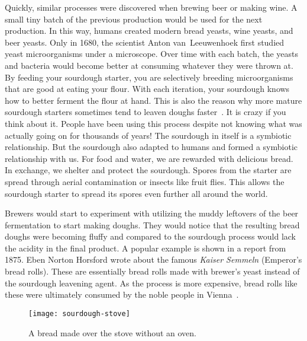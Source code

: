 Quickly, similar processes were discovered when brewing beer
or making wine. A small tiny batch of the previous production
would be used for the next production. In this way, humans created
modern bread yeasts, wine yeasts, and beer yeasts. Only in 1680,
the scientist Anton van~Leeuwenhoek first studied yeast microorganisms
under a microscope. Over time with each batch, the yeasts and bacteria
would become better at consuming whatever they were thrown at.
By feeding your sourdough starter, you are selectively breeding
microorganisms that are good at eating your flour. With
each iteration, your sourdough knows how to better ferment the flour
at hand. This is also the reason why more mature sourdough starters sometimes
tend to leaven doughs faster~\cite{review+of+sourdough+starters}. It is crazy if you
think about it. People have been using this process despite not
knowing what was actually going on for thousands of years! The
sourdough in itself is a symbiotic relationship. But the sourdough
also adapted to humans and formed a symbiotic relationship with us.
For food and water, we are rewarded with delicious bread. In exchange,
we shelter and protect the sourdough. Spores from the starter
are spread through aerial contamination or insects like fruit flies.
This allows the sourdough starter to spread its spores even
further all around the world.

Brewers would start to experiment with utilizing the muddy leftovers
of the beer fermentation to start making doughs. They would notice
that the resulting bread doughs were becoming fluffy and compared
to the sourdough process would lack the acidity in the final product.
A popular example is shown in a report from 1875. Eben Norton Horsford
wrote about the famous \emph{Kaiser Semmeln} (Emperor's bread rolls).
These are essentially bread rolls made with brewer's yeast instead
of the sourdough leavening agent. As the process is more expensive,
bread rolls like these were ultimately consumed by the noble people
in Vienna~\cite{vienna+breadrolls}.

\begin{figure}[ht]
  \texttt{[image: sourdough-stove]}
  \caption{A bread made over the stove without an oven.}%
  \label{sourdough-stove}
\end{figure}

